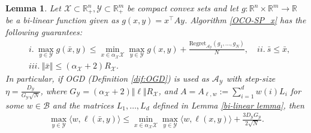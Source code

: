 \documentclass[a4paper,12pt]{article}
\newtheorem{lemma} {Lemma}
\newcommand{\mY}{\mathcal{Y}}
\newcommand{\mX}{\mathcal{X}}
\newcommand{\mA}{\mathcal{A}}
\newcommand{\mB}{\mathcal{B}}
\newcommand{\reals}{\mathbb{R}}
\newcommand{\oraclex}{\mathcal{O}_{\mX}}
\begin{document}
\begin{lemma}\label{lemma:OCO-SP_x}
Let $\mX\subset \reals^n_+ , \mY\subset \reals^m_+$ be compact convex sets and let $g:\reals^n \times \reals^m \to \reals$ be a bi-linear function given as $g(x,y)=x^\top A y$. Algorithm \ref{OCO-SP_x} has the following guarantees:
\begin{align*}
&i.~\max_{y \in \mY} g(\bar{x},y) \leq \min_{x\in \alpha_{\mX} \mX} \max_{y \in \mY} g(x,y)+ \frac{\text{Regret}_{\mathcal{A}_\mY}(g_1,\dots,g_N)}{N},\quad  ii.~ \bar{s}\leq \bar{x}, \\
&iii.~\Vert{\bar{x}}\Vert \leq (\alpha_{\mX}+2)R_{\mX}.
\end{align*}
In particular, if OGD (Definition \ref{dif:OGD}) is used as  $\mA_{\mY}$ with step-size $\eta =\frac{D_{\mY}}{G_{\mY}\sqrt{N}}$, where $G_{\mY}=(\alpha_{\mX}+2)\Vert \ell \Vert R_\mX$, and $A = A_{\ell,w} := \sum_{i=1}^dw(i)L_i$ for some $w\in\mB$ and the matrices $L_1,\dots,L_d$ defined in Lemma \ref{bi-linear lemma}, then 
\begin{align*}
\max_{y \in \mY} \langle{w,\ell(\bar{x},y)}\rangle \leq \min_{x\in \alpha_{\mX} \mX} \max_{y \in \mY}\langle{w,\ell(x,y)}\rangle+ \frac{3 D_{\mY} G_{\mY}}{2\sqrt{N}}.
\end{align*}
\end{lemma}
\end{document}
